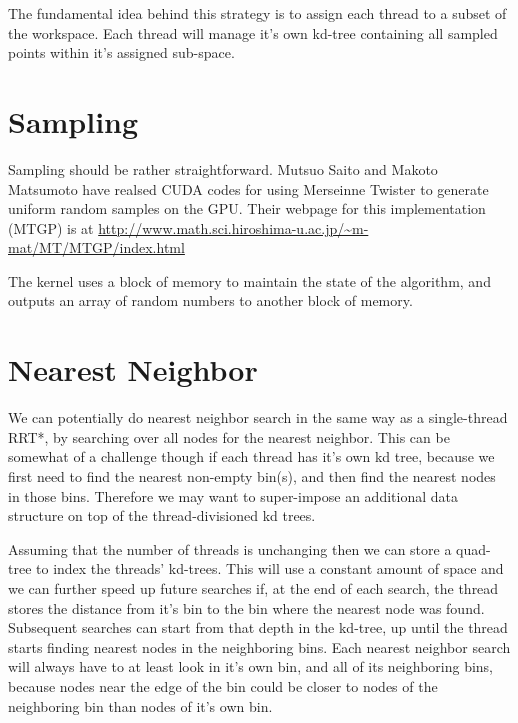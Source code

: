 
\maketitle

The fundamental idea behind this strategy is to assign each thread to a subset of the workspace. Each thread will manage it's own kd-tree containing all sampled points within it's assigned sub-space. 

\begin{figure}[h]
\begin{centering}
    \texttt{[image: \\figfile\{fig/thread\_kdtree]}}
    \caption{Division Strategy}
\end{centering}
\end{figure}

\section{Sampling}

Sampling should be rather straightforward. Mutsuo Saito and Makoto Matsumoto have realsed CUDA codes for using Merseinne Twister to generate uniform random samples on the GPU. Their webpage for this implementation (MTGP) is at \url{http://www.math.sci.hiroshima-u.ac.jp/~m-mat/MT/MTGP/index.html}

The kernel uses a block of memory to maintain the state of the algorithm, and outputs an array of random numbers to another block of memory. 

\section{Nearest Neighbor}

We can potentially do nearest neighbor search in the same way as a single-thread RRT*, by searching over all nodes for the nearest neighbor. This can be somewhat of a challenge though if each thread has it's own kd tree, because we first need to find the nearest non-empty bin(s), and then find the nearest nodes in those bins. Therefore we may want to super-impose an additional data structure on top of the thread-divisioned kd trees.  

Assuming that the number of threads is unchanging then we can store a quad-tree to index the threads' kd-trees. This will use a constant amount of space and we can further speed up future searches if, at the end of each search, the thread stores the distance from it's bin to the bin where the nearest node was found. Subsequent searches can start from that depth in the kd-tree, up until the thread starts finding nearest nodes in the neighboring bins. Each nearest neighbor search will always have to at least look in it's own bin, and all of its neighboring bins, because nodes near the edge of the bin could be closer to nodes of the neighboring bin than nodes of it's own bin.

